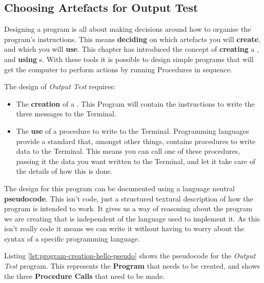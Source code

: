 \subsection{Choosing Artefacts for Output Test} %
\label{sub:choosing_artefacts_hello_world}

Designing a program is all about making decisions around how to organise the program's instructions. This means \textbf{deciding} on which artefacts you will \textbf{create}, and which you will \textbf{use}. This chapter has introduced the concept of \textbf{creating} a , and \textbf{using} s. With these tools it is possible to design simple programs that will get the computer to perform actions by running Procedures in sequence.

The design of \emph{Output Test} requires:

\begin{itemize}
  \item The \textbf{creation} of a . This Program will contain the instructions to write the three messages to the Terminal.
  \item The \textbf{use} of a procedure to write to the Terminal. Programming languages provide a standard  that, amongst other things, contains procedures to write data to the Terminal. This means you can call one of these procedures, passing it the data you want written to the Terminal, and let it take care of the details of how this is done.
\end{itemize}

\bigskip

The design for this program can be documented using a language neutral \textbf{pseudocode}. This isn't code, just a structured textural description of how the program is intended to work. It gives us a way of reasoning about the program we are creating that is independent of the language used to implement it. As this isn't really code it means we can write it without having to worry about the syntax of a specific programming language.

Listing \ref{lst:program-creation-hello-pseudo} shows the pseudocode for the \emph{Output Test} program. This represents the \textbf{Program} that needs to be created, and shows the three \textbf{Procedure Calls} that need to be made. 



